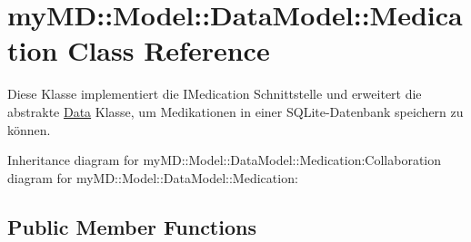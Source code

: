 \hypertarget{classmy_m_d_1_1_model_1_1_data_model_1_1_medication}{
\section{my\-MD::Model::Data\-Model::Medication Class Reference}
\label{d0/daf/classmy_m_d_1_1_model_1_1_data_model_1_1_medication}
}
Diese Klasse implementiert die IMedication Schnittstelle und erweitert die abstrakte \hyperlink{classmy_m_d_1_1_model_1_1_data_model_1_1_data}{Data} Klasse, um Medikationen in einer SQLite-Datenbank speichern zu k\"{o}nnen.  


Inheritance diagram for my\-MD::Model::Data\-Model::Medication:Collaboration diagram for my\-MD::Model::Data\-Model::Medication:\subsection*{Public Member Functions}
